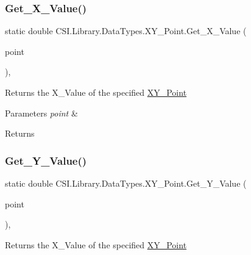 \subsubsection{\texorpdfstring{Get\_X\_Value()}{Get\_X\_Value()}}
{\footnotesize\ttfamily static double C\+S\+I.\+Library.\+Data\+Types.\+X\+Y\+\_\+\+Point.\+Get\+\_\+\+X\+\_\+\+Value (\begin{DoxyParamCaption}\item[{\mbox{\hyperlink{struct_c_s_i_1_1_library_1_1_data_types_1_1_x_y___point}{X\+Y\+\_\+\+Point}}}]{point }\end{DoxyParamCaption})\hspace{0.3cm}{\ttfamily [inline]}, {\ttfamily [static]}}



Returns the X\+\_\+\+Value of the specified \mbox{\hyperlink{struct_c_s_i_1_1_library_1_1_data_types_1_1_x_y___point}{X\+Y\+\_\+\+Point}} 


\begin{DoxyParams}{Parameters}
{\em point} & \\
\hline
\end{DoxyParams}
\begin{DoxyReturn}{Returns}

\end{DoxyReturn}
\mbox{\label{struct_c_s_i_1_1_library_1_1_data_types_1_1_x_y___point_a9c0d06c62ece74ed392968218f77e54a}} 
\subsubsection{\texorpdfstring{Get\_Y\_Value()}{Get\_Y\_Value()}}
{\footnotesize\ttfamily static double C\+S\+I.\+Library.\+Data\+Types.\+X\+Y\+\_\+\+Point.\+Get\+\_\+\+Y\+\_\+\+Value (\begin{DoxyParamCaption}\item[{\mbox{\hyperlink{struct_c_s_i_1_1_library_1_1_data_types_1_1_x_y___point}{X\+Y\+\_\+\+Point}}}]{point }\end{DoxyParamCaption})\hspace{0.3cm}{\ttfamily [inline]}, {\ttfamily [static]}}



Returns the X\+\_\+\+Value of the specified \mbox{\hyperlink{struct_c_s_i_1_1_library_1_1_data_types_1_1_x_y___point}{X\+Y\+\_\+\+Point}} 


